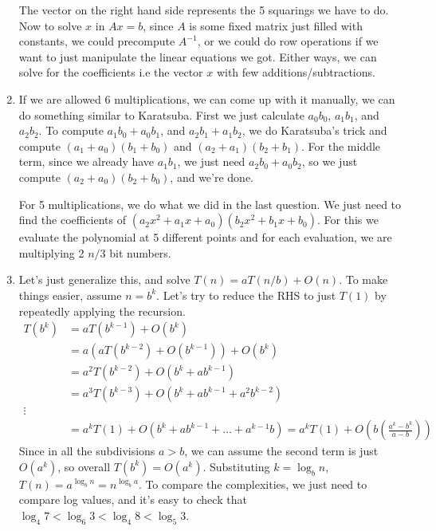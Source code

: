 \documentclass[12pt]{report}
\begin{document}
\begin{enumerate}[label=\textbf{\arabic*.}]
    The vector on the right hand side represents the 5 squarings we have to do. Now to solve $x$ in $Ax = b$, since $A$ is some fixed matrix
    just filled with constants, we could precompute $A^{-1}$, or we could do row operations if we want to just manipulate the linear equations
    we got. Either ways, we can solve for the coefficients i.e the vector $x$ with few additions/subtractions.

    \item If we are allowed 6 multiplications, we can come up with it manually, we can do something similar to Karatsuba. First we just calculate
    $a_0 b_0$, $a_1 b_1$, and $a_2 b_2$. To compute $a_1 b_0 + a_0 b_1$, and $a_2 b_1 + a_1 b_2$, we do Karatsuba's trick and compute 
    $(a_1 + a_0)(b_1 + b_0)$ and $(a_2 + a_1)(b_2 + b_1)$. For the middle term, since we already have $a_1 b_1$, we just need $a_2 b_0 + a_0 b_2$,
    so we just compute $(a_2 + a_0)(b_2 + b_0)$, and we're done.

    For 5 multiplications, we do what we did in the last question. We just need to find the coefficients of $(a_2 x^2 + a_1 x + a_0)
    (b_2 x^2 + b_1 x + b_0)$. For this we evaluate the polynomial at 5 different points and for each evaluation, we are multiplying 
    2 $n/3$ bit numbers.

    \item Let's just generalize this, and solve $T(n) = aT(n/b) + O(n)$. To make things easier, assume $n = b^k$. Let's try to reduce 
    the RHS to just $T(1)$ by repeatedly applying the recursion.
    \begin{align*}
        T(b^k) &= aT(b^{k-1}) + O(b^k) \\
        &= a(aT(b^{k-2}) + O(b^{k-1})) + O(b^k) \\
        &= a^2 T(b^{k-2}) + O(b^k + a b^{k-1}) \\
        &= a^3 T(b^{k-3}) + O(b^k + a b^{k-1} + a^2 b^{k-2}) \\
        \vdots \\
        &= a^k T(1) + O(b^k + a b^{k-1} + \dots + a^{k-1} b) = a^k T(1) + O\left(b\left(\frac{a^k - b^k}{a - b}\right)\right)
    \end{align*}
    Since in all the subdivisions $a > b$, we can assume the second term is just $O(a^k)$, so overall $T(b^k) = O(a^k)$. Substituting
    $k = \log_b n$, $T(n) = a^{\log_b n} = n^{\log_b a}$. To compare the complexities, we just need to compare log values, and it's easy
    to check that $\log_4 7 < \log_6 3 < \log_4 8 < \log_5 3$.


\end{enumerate}
\end{document}
